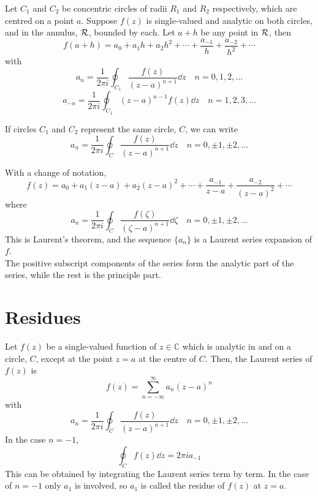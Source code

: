 \begin{theorem}
  Let $C_1$ and $C_2$ be concentric circles of radii $R_1$ and $R_2$
  respectively, which are centred on a point $a$. Suppose $f(z)$ is
  single-valued and analytic on both circles, and in the annulus,
  ${\cal R}$, bounded by each.  Let $a+h$ be any point in ${\cal R}$,
  then
  \[ f(a+h) = a_0 + a_1 h + a_2 h^2 + \cdots + \frac{a_{-1}}{h} +
  \frac{a_{-2}}{h^2} + \cdots \] with \[ a_n = \frac{1}{2 \pi i}
  \oint_{C_1} \frac{f(z)}{(z-a)^{n+1}} \dd{z} \quad n=0,1,2, \dots\]
  \[ a_{-n} = \frac{1}{2 \pi i} \oint_{C_1} (z-a)^{n-1} f(z) \dd{z}
  \quad n = 1,2, 3,\dots \]

  If circles $C_1$ and $C_2$ represent the same circle, $C$, we can
  write
  \[ a_n = \frac{1}{2 \pi i} \oint_C \frac{f(z)}{(z-a)^{n+1}} \dd{z}
  \quad n = 0, \pm 1, \pm 2,\dots \]

  With a change of notation,
  \[ f(z) = a_0 + a_1(z-a) + a_2 (z-a)^2 + \cdots + \frac{a_{-1}}{z-a}
  + \frac{a_{-2}}{(z-a)^2} + \cdots \] where
  \[ a_n = \frac{1}{2 \pi i} \oint_C \frac{f(\zeta)}{(\zeta -
    a)^{n+1}} \dd{\zeta} \quad n = 0, \pm 1, \pm 2, \dots \] This is
  Laurent's theorem, and the sequence $\{ a_n \}$ is a Laurent series
  expansion of $f$.\\
  The positive subscript components of the series form the analytic
  part of the series, while the rest is the principle part.
\end{theorem}




\section{Residues}
\label{sec:residues}

\begin{definition}[Residue]
  Let $f(z)$ be a single-valued function of $z \in \mathbb{C}$ which
  is analytic in and on a circle, $C$, except at the point $z=a$ at
  the centre of $C$. Then, the Laurent series of $f(z)$ is
  \[ f(z) = \sum_{n= - \infty}^{\infty} a_n (z-a)^n \] with \[ a_n =
  \frac{1}{2 \pi i} \oint_C \frac{f(z)}{(z-a)^{n+1}} \dd{z} \quad n =
  0, \pm 1, \pm 2, \dots \] In the case $n=-1$,
  \[ \oint_C f(z) \dd{z} = 2 \pi i a_{-1} \] This can be obtained by
  integrating the Laurent series term by term. In the case of $n=-1$
  only $a_1$ is involved, so $a_1$ is called the residue of $f(z)$ at
  $z=a$.
\end{definition}

%
